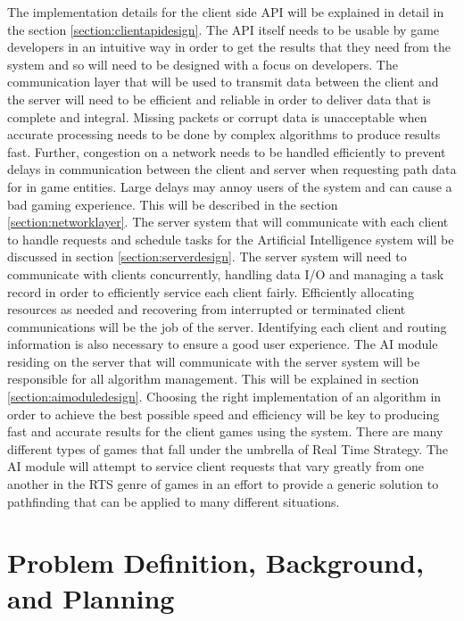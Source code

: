 \documentclass[12pt,a4paper,titlepage]{article}
\begin{document}
The implementation details for the client side API will be explained in detail in the section \ref{section:clientapidesign}. The API itself needs to be usable by game developers in an intuitive way in order to get the results that they need from the system and so will need to be designed with a focus on developers. The communication layer that will be used to transmit data between the client and the server will need to be efficient and reliable in order to deliver data that is complete and integral. Missing packets or corrupt data is unacceptable when accurate processing needs to be done by complex algorithms to produce results fast. Further, congestion on a network needs to be handled efficiently to prevent delays in communication between the client and server when requesting path data for in game entities. Large delays may annoy users of the system and can cause a bad gaming experience. This will be described in the section \ref{section:networklayer}. The server system that will communicate with each client to handle requests and schedule tasks for the Artificial Intelligence system will be discussed in section \ref{section:serverdesign}. The server system will need to communicate with clients concurrently, handling data I/O and managing a task record in order to efficiently service each client fairly. Efficiently allocating resources as needed and recovering from interrupted or terminated client communications will be the job of the server. Identifying each client and routing information is also necessary to ensure a good user experience. The AI module residing on the server that will communicate with the server system will be responsible for all algorithm management. This will be explained in section \ref{section:aimoduledesign}. Choosing the right implementation of an algorithm in order to achieve the best possible speed and efficiency will be key to producing fast and accurate results for the client games using the system. There are many different types of games that fall under the umbrella of Real Time Strategy. The AI module will attempt to service client requests that vary greatly from one another in the RTS genre of games in an effort to provide a generic solution to pathfinding that can be applied to many different situations.

\section{Problem Definition, Background, and Planning}
\end{document}

